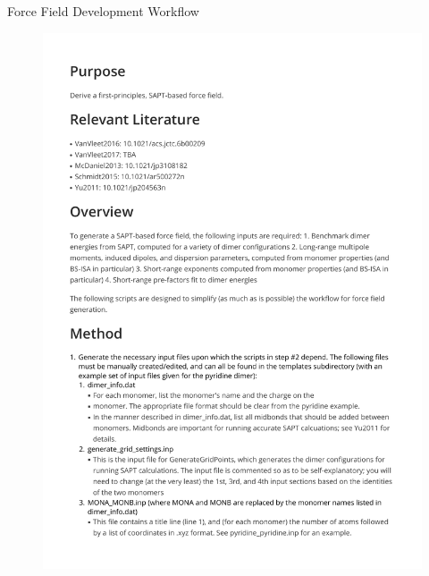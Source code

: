 \begin{chapter}{Force Field Development Workflow}
\begin{figure}
\includegraphics[page=2,width=1.0\textwidth]{workflow/github_readme.pdf}
\end{figure}
\begin{figure}\ContinuedFloat
\centering

\end{figure}
\end{chapter}
